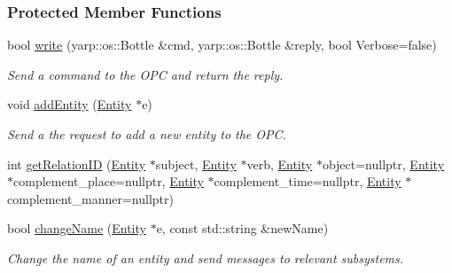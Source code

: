\subsubsection*{Protected Member Functions}
\begin{DoxyCompactItemize}
\item 
bool \hyperlink{group__icubclient__clients_a92aeb4c3bb65cd62368980a28496d024}{write} (yarp\+::os\+::\+Bottle \&cmd, yarp\+::os\+::\+Bottle \&reply, bool Verbose=false)
\begin{DoxyCompactList}\small\item\em Send a command to the O\+PC and return the reply. \end{DoxyCompactList}\item 
void \hyperlink{group__icubclient__clients_aeddebad5a837addc613f0234aa59d4cb}{add\+Entity} (\hyperlink{group__icubclient__representations_classicubclient_1_1Entity}{Entity} $\ast$e)
\begin{DoxyCompactList}\small\item\em Send a the request to add a new entity to the O\+PC. \end{DoxyCompactList}\item 
int \hyperlink{group__icubclient__clients_a3dbf81c34467613af606013e45042f01}{get\+Relation\+ID} (\hyperlink{group__icubclient__representations_classicubclient_1_1Entity}{Entity} $\ast$subject, \hyperlink{group__icubclient__representations_classicubclient_1_1Entity}{Entity} $\ast$verb, \hyperlink{group__icubclient__representations_classicubclient_1_1Entity}{Entity} $\ast$object=nullptr, \hyperlink{group__icubclient__representations_classicubclient_1_1Entity}{Entity} $\ast$complement\+\_\+place=nullptr, \hyperlink{group__icubclient__representations_classicubclient_1_1Entity}{Entity} $\ast$complement\+\_\+time=nullptr, \hyperlink{group__icubclient__representations_classicubclient_1_1Entity}{Entity} $\ast$complement\+\_\+manner=nullptr)
\item 
bool \hyperlink{group__icubclient__clients_a0b4c570e07720cc25c203eda14adda99}{change\+Name} (\hyperlink{group__icubclient__representations_classicubclient_1_1Entity}{Entity} $\ast$e, const std\+::string \&new\+Name)
\begin{DoxyCompactList}\small\item\em Change the name of an entity and send messages to relevant subsystems. \end{DoxyCompactList}\end{DoxyCompactItemize}
